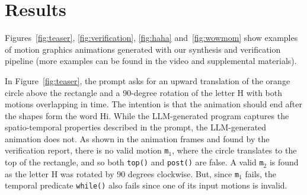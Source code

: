 \section{Results}
\label{sec:results}

Figures~\ref{fig:teaser}, \ref{fig:verification}, \ref{fig:haha} and~\ref{fig:wowmom}  show
examples of motion graphics animations generated with our
synthesis and verification pipeline (more examples can be found in the
video and supplemental materials).
%
%

In Figure~\ref{fig:teaser}, the prompt asks for an upward
translation of the orange circle above the rectangle and a 90-degree
rotation of the letter H with both motions overlapping in
time. The intention is that the animation should end after the shapes
form the word Hi.
While the LLM-generated \dslname{} program captures the spatio-temporal
properties described in the prompt, 
the LLM-generated animation 
does not.
%
As shown in the animation frames and found by the verification
report, there is no valid motion \texttt{m}$_1$,
where the circle
translates to the top of the rectangle, and so both \texttt{top()}
and \texttt{post()} are false.
%
A valid \texttt{m}$_2$ is found as the letter H was
rotated by 90 degrees clockwise.
%
But, since \texttt{m}$_1$ fails, the temporal
predicate \texttt{while()} also fails since one of its input motions is
invalid.
%
%




